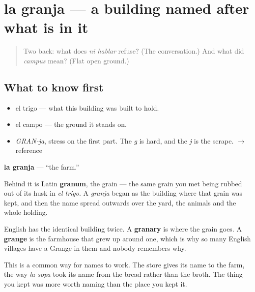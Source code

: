 \section[la granja]{la granja — a building named after what is in it}

\label{lesson:ES-C299-granja}



\begin{quote}
Two back: what does \emph{ni hablar} refuse? (The conversation.) And what did \emph{campus} mean? (Flat open ground.)
\end{quote}

\subsection*{What to know first}
\begin{itemize}
\raggedright
  \item el trigo — what this building was built to hold.
  \item el campo — the ground it stands on.
\end{itemize}

\begin{sounds}
\begin{itemize}
\raggedright
  \item \emph{GRAN-ja}, stress on the first part. The \emph{g} is hard, and the \emph{j} is the scrape. $\to$ reference
\end{itemize}
\end{sounds}

\begin{cousinweb}
\textbf{la granja} — \textquotedblleft{}the farm.\textquotedblright{}

Behind it is Latin \textbf{granum}, the grain — the same grain you met being rubbed out of its husk in \emph{el trigo}. A \emph{granja} began as the building where that grain was kept, and then the name spread outwards over the yard, the animals and the whole holding.

English has the identical building twice. A \textbf{granary} is where the grain goes. A \textbf{grange} is the farmhouse that grew up around one, which is why so many English villages have a Grange in them and nobody remembers why.

This is a common way for names to work. The store gives its name to the farm, the way \emph{la sopa} took its name from the bread rather than the broth. The thing you kept was more worth naming than the place you kept it.
\end{cousinweb}

